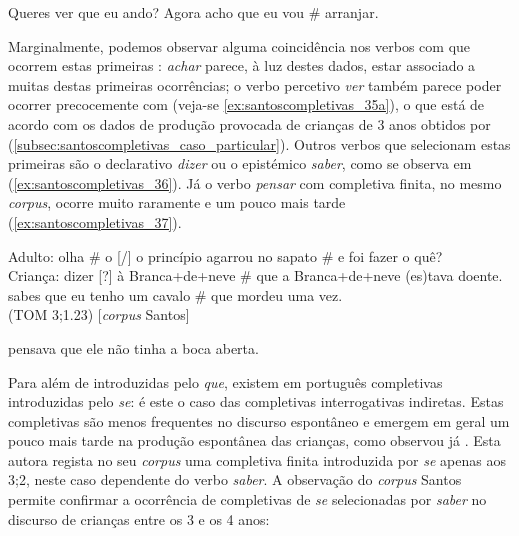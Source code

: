 \documentclass[output=paper]{LSP/langsci}
\begin{document}
\ea\label{ex:santoscompletivas_35}
\ea\label{ex:santoscompletivas_35a} Queres ver que eu ando? 
\ex\label{ex:santoscompletivas_35b} Agora acho que eu vou \# arranjar.
\zl

Marginalmente, podemos observar alguma coincidência nos verbos com que ocorrem estas primeiras : \textit{achar} parece, à luz destes dados, estar associado a muitas destas primeiras ocorrências; o verbo percetivo \textit{ver} também parece poder ocorrer precocemente com  (veja-se \ref{ex:santoscompletivas_35a}), o que está de acordo com os dados de produção provocada de crianças de 3 anos obtidos por \citet{santos_etal2016} (\ref{subsec:santoscompletivas_caso_particular}). Outros verbos que selecionam estas primeiras  são o declarativo \textit{dizer} ou o epistémico \textit{saber}, como se observa em (\ref{ex:santoscompletivas_36}). Já o verbo \textit{pensar} com completiva finita, no mesmo \textit{corpus}, ocorre muito raramente e um pouco mais tarde (\ref{ex:santoscompletivas_37}).

\ea\label{ex:santoscompletivas_36}
\ea\label{ex:santoscompletivas_36a} Adulto: olha \# o [/] o princípio agarrou no sapato \# e foi fazer o quê?\\
Criança: dizer [?] à Branca+de+neve \# que a Branca+de+neve (es)tava doente.
\ex\label{ex:santoscompletivas_36b} sabes que eu tenho um cavalo \# que mordeu uma vez.\\(TOM 3;1.23) [\textit{corpus} Santos]
\zl

\ea\label{ex:santoscompletivas_37} pensava que ele não tinha a boca aberta.
\z

Para além de  introduzidas pelo  \textit{que}, existem em português completivas introduzidas pelo  \textit{se}: é este o caso das completivas interrogativas indiretas. Estas completivas são menos frequentes no discurso espontâneo e emergem em geral um pouco mais tarde na produção espontânea das crianças, como observou já \citet{soares2006}. Esta autora regista no seu \textit{corpus} uma completiva finita introduzida por \textit{se} apenas aos 3;2, neste caso dependente do verbo \textit{saber}. A observação do \textit{corpus} Santos permite confirmar a ocorrência de completivas de \textit{se} selecionadas por \textit{saber} no discurso de crianças entre os 3 e os 4 anos:
\end{document}
